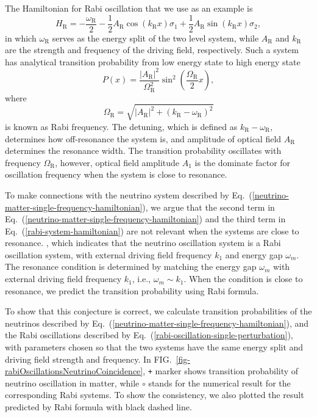 \documentclass[%
reprint,
 amsmath,amssymb,
 aps,
]{revtex4-1}
\begin{document}
The Hamiltonian for Rabi oscillation that we use as an example is
\begin{equation}
    H_{\mathrm R} = - \frac{\omega_{\mathrm R}}{2} - \frac{1}{2}A_{\mathrm{R}} \cos (k_{\mathrm{R}} x) \sigma_1 + \frac{1}{2} A_{\mathrm{R}} \sin (k_{\mathrm{R}} x) \sigma_2,\label{rabi-oscillation-single-perturbation}
\end{equation}
in which $\omega_{\mathrm R}$ serves as the energy split of the two level system, while $A_{\mathrm{R}}$ and $k_{\mathrm{R}}$ are the strength and frequency of the driving field, respectively. Such a system has analytical transition probability from low energy state to high energy state
\begin{equation}
    P(x) = \frac{\left \lvert A_{\mathrm{R}} \right \rvert ^2}{ \Omega_{\mathrm R}^2 } \sin^2 \left( \frac{\Omega_{\mathrm R}}{2} x \right),
    \label{rabi-system-hamiltonian}
\end{equation}
where
\begin{equation}
\Omega_{\mathrm R} = \sqrt{ \lvert A_{\mathrm{R}}\rvert^2 + (k_{\mathrm{R}} - \omega_{\mathrm R})^2 }
\end{equation} is known as Rabi frequency. The detuning, which is defined as $k_{\mathrm{R}} - \omega_{\mathrm R}$, determines how off-resonance the system is, and amplitude of optical field $A_{\mathrm{R}}$ determines the resonance width. The transition probability oscillates with frequency $\Omega_{\mathrm R}$, however, optical field amplitude $A_1$ is the dominate factor for oscillation frequency when the system is close to resonance.


To make connections with the neutrino system described by Eq.~(\ref{neutrino-matter-single-frequency-hamiltonian}), we argue that the second term in Eq.~(\ref{neutrino-matter-single-frequency-hamiltonian}) and the third term in Eq.~(\ref{rabi-system-hamiltonian}) are not relevant when the systems are close to resonance. , which indicates that the neutrino oscillation system is a Rabi oscillation system, with external driving field frequency $k_1$ and energy gap $\omega_m$. The resonance condition is determined by matching the energy gap $\omega_m$ with external driving field frequency $k_1$, i.e., $\omega_m \sim k_1$. When the condition is close to resonance, we predict the transition probability using Rabi formula.

To show that this conjecture is correct, we calculate transition probabilities of the neutrinos described by Eq.~(\ref{neutrino-matter-single-frequency-hamiltonian}), and the Rabi oscillations described by Eq.~(\ref{rabi-oscillation-single-perturbation}), with parameters chosen so that the two systems have the same energy split and driving field strength and frequency. In FIG.~\ref{fig-rabiOscillationsNeutrinoCoincidence}, \verb|+| marker shows transition probability of neutrino oscillation in matter, while $\circ$ stands for the numerical result for the corresponding Rabi systems. To show the consistency, we also plotted the result predicted by Rabi formula with black dashed line.
\end{document}
